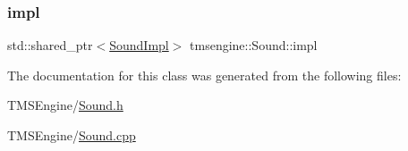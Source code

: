 \subsubsection{\texorpdfstring{impl}{impl}}
{\footnotesize\ttfamily std\+::shared\+\_\+ptr$<$\hyperlink{structtmsengine_1_1_sound_impl}{Sound\+Impl}$>$ tmsengine\+::\+Sound\+::impl\hspace{0.3cm}{\ttfamily [private]}}



The documentation for this class was generated from the following files\+:\begin{DoxyCompactItemize}
\item 
T\+M\+S\+Engine/\hyperlink{_sound_8h}{Sound.\+h}\item 
T\+M\+S\+Engine/\hyperlink{_sound_8cpp}{Sound.\+cpp}\end{DoxyCompactItemize}
